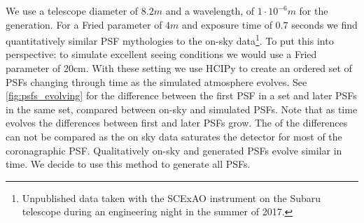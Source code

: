 We use a telescope diameter of $8.2m$ and a wavelength, of $1\cdot 10^{-6}m$ for the generation. For a Fried parameter of $4m$ and exposure time of $0.7$ seconds we find quantitatively similar \ac{PSF} mythologies to the on-sky data\footnote{Unpublished data taken with the SCExAO instrument on the Subaru telescope during an engineering night in the summer of 2017.}. To put this into perspective: to simulate excellent seeing conditions we would use a Fried parameter of 20cm. With these setting we use \ac{HCIPy} to create an ordered set of \acp{PSF} changing through time as the simulated atmosphere evolves. See \autoref{fig:psfs_evolving} for the difference between the first \ac{PSF} in a set and later \acp{PSF} in the same set, compared between on-sky and simulated \acp{PSF}. Note that as time evolves the differences between first and later \acp{PSF} grow. The  of the differences can not be compared as the on sky data saturates the detector for most of the coronagraphic \ac{PSF}. Qualitatively on-sky and generated \acp{PSF} evolve similar in time. We decide to use this method to generate all \acp{PSF}.



